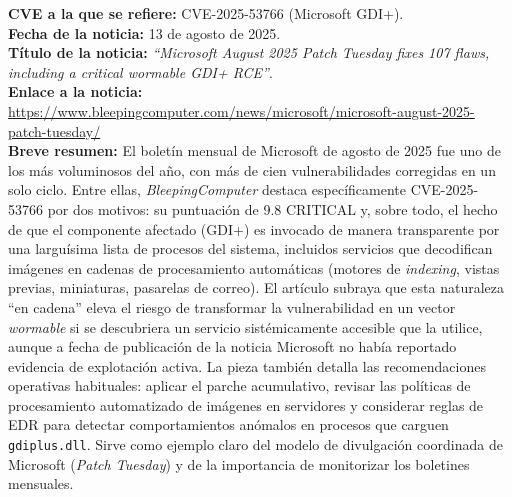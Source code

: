 \begin{tcolorbox}[breakable, colback=lightblue, colframe=darkblue, title=\textbf{Ficha de noticia 2}]
\textbf{CVE a la que se refiere:} CVE-2025-53766 (Microsoft GDI+).\\
\textbf{Fecha de la noticia:} 13 de agosto de 2025.\\
\textbf{Título de la noticia:} \textit{``Microsoft August 2025 Patch Tuesday fixes 107 flaws, including a critical wormable GDI+ RCE''}.\\
\textbf{Enlace a la noticia:} \url{https://www.bleepingcomputer.com/news/microsoft/microsoft-august-2025-patch-tuesday/}\\
\textbf{Breve resumen:} El boletín mensual de Microsoft de agosto de 2025 fue uno de los más voluminosos del año, con más de cien vulnerabilidades corregidas en un solo ciclo. Entre ellas, \textit{BleepingComputer} destaca específicamente CVE-2025-53766 por dos motivos: su puntuación de 9.8 CRITICAL y, sobre todo, el hecho de que el componente afectado (GDI+) es invocado de manera transparente por una larguísima lista de procesos del sistema, incluidos servicios que decodifican imágenes en cadenas de procesamiento automáticas (motores de \textit{indexing}, vistas previas, miniaturas, pasarelas de correo). El artículo subraya que esta naturaleza ``en cadena'' eleva el riesgo de transformar la vulnerabilidad en un vector \textit{wormable} si se descubriera un servicio sistémicamente accesible que la utilice, aunque a fecha de publicación de la noticia Microsoft no había reportado evidencia de explotación activa. La pieza también detalla las recomendaciones operativas habituales: aplicar el parche acumulativo, revisar las políticas de procesamiento automatizado de imágenes en servidores y considerar reglas de EDR para detectar comportamientos anómalos en procesos que carguen \texttt{gdiplus.dll}. Sirve como ejemplo claro del modelo de divulgación coordinada de Microsoft (\textit{Patch Tuesday}) y de la importancia de monitorizar los boletines mensuales.
\end{tcolorbox}

